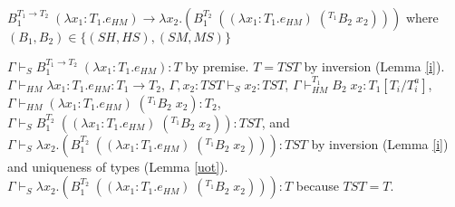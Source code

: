 \begin{case}
$B_{1}^{T_{1}\rightarrow T_{2}}\;(\lambda x_{1}:T_{1}.e_{HM})\rightarrow\lambda x_{2}.(B_{1}^{T_{2}}\;((\lambda x_{1}:T_{1}.e_{HM})\;(^{T_{1}}B_{2}\;x_{2})))$ where $(B_{1},B_{2})\in\lbrace(SH,HS),(SM,MS)\rbrace$

$\Gamma\vdash_{S}B_{1}^{T_{1}\rightarrow T_{2}}\;(\lambda x_{1}:T_{1}.e_{HM}):T$ by premise.  $T=TST$ by inversion (Lemma \ref{i}).  $\Gamma\vdash_{HM}\lambda x_{1}:T_{1}.e_{HM}:T_{1}\rightarrow T_{2}$, $\Gamma,x_{2}:TST\vdash_{S}x_{2}:TST$, $\Gamma\vdash_{HM}^{T_{1}}B_{2}\;x_{2}:T_{1}[T_{i}/T_{i}^{a}]$, $\Gamma\vdash_{HM}(\lambda x_{1}:T_{1}.e_{HM})\;(^{T_{1}}B_{2}\;x_{2}):T_{2}$, $\Gamma\vdash_{S}B_{1}^{T_{2}}\;((\lambda x_{1}:T_{1}.e_{HM})\;(^{T_{1}}B_{2}\;x_{2})):TST$, and $\Gamma\vdash_{S}\lambda x_{2}.(B_{1}^{T_{2}}\;((\lambda x_{1}:T_{1}.e_{HM})\;(^{T_{1}}B_{2}\;x_{2}))):TST$ by inversion (Lemma \ref{i}) and uniqueness of types (Lemma \ref{uot}).  $\Gamma\vdash_{S}\lambda x_{2}.(B_{1}^{T_{2}}\;((\lambda x_{1}:T_{1}.e_{HM})\;(^{T_{1}}B_{2}\;x_{2}))):T$ because $TST=T$.
\end{case}